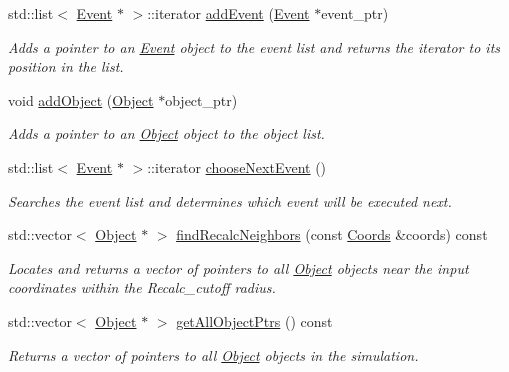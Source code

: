 \begin{DoxyCompactItemize}
\item 
std\+::list$<$ \hyperlink{class_event}{Event} $\ast$ $>$\+::iterator \hyperlink{class_simulation_a4b84249d359723e00ec4ae77164c8b7d}{add\+Event} (\hyperlink{class_event}{Event} $\ast$event\+\_\+ptr)
\begin{DoxyCompactList}\small\item\em Adds a pointer to an \hyperlink{class_event}{Event} object to the event list and returns the iterator to its position in the list. \end{DoxyCompactList}\item 
void \hyperlink{class_simulation_a1e0f43c4e11eda5486054c250f4de08f}{add\+Object} (\hyperlink{class_object}{Object} $\ast$object\+\_\+ptr)
\begin{DoxyCompactList}\small\item\em Adds a pointer to an \hyperlink{class_object}{Object} object to the object list. \end{DoxyCompactList}\item 
std\+::list$<$ \hyperlink{class_event}{Event} $\ast$ $>$\+::iterator \hyperlink{class_simulation_a401d40509ba367a28702873a0d65188d}{choose\+Next\+Event} ()
\begin{DoxyCompactList}\small\item\em Searches the event list and determines which event will be executed next. \end{DoxyCompactList}\item 
std\+::vector$<$ \hyperlink{class_object}{Object} $\ast$ $>$ \hyperlink{class_simulation_aa6501dc60b4a3981f6ca44cec861364a}{find\+Recalc\+Neighbors} (const \hyperlink{struct_coords}{Coords} \&coords) const
\begin{DoxyCompactList}\small\item\em Locates and returns a vector of pointers to all \hyperlink{class_object}{Object} objects near the input coordinates within the Recalc\+\_\+cutoff radius. \end{DoxyCompactList}\item 
\mbox{\label{class_simulation_a620684b9ac1fb07344c4c2237ed9f352}} 
std\+::vector$<$ \hyperlink{class_object}{Object} $\ast$ $>$ \hyperlink{class_simulation_a620684b9ac1fb07344c4c2237ed9f352}{get\+All\+Object\+Ptrs} () const
\begin{DoxyCompactList}\small\item\em Returns a vector of pointers to all \hyperlink{class_object}{Object} objects in the simulation. \end{DoxyCompactList}\item 

\end{DoxyCompactItemize}

